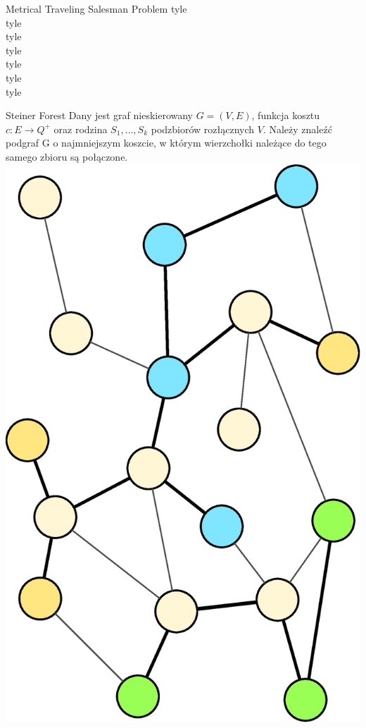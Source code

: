 \documentclass[final,hyperref={pdfpagelabels=false}]{beamer}
\begin{document}
\begin{frame}
\begin{columns}
\begin{column}{.96\textwidth}
			\begin{block}{Metrical Traveling Salesman Problem}
				tyle\\
				tyle\\
				tyle\\
				tyle\\
				tyle\\
				tyle\\
				tyle\\
			\end{block}
			\begin{block}{Steiner Forest}
				Dany jest graf nieskierowany $G = (V, E)$, funkcja kosztu $c: E \rightarrow Q^+$ oraz rodzina $S_1, \hdots, S_k$ podzbiorów rozłącznych $V$. Należy znaleźć podgraf G o najmniejszym koszcie, w którym wierzchołki należące do tego samego zbioru są połączone.
        \includegraphics[scale=0.5]{sf_poster.eps}

\end{block}
\end{column}
\end{columns}
\end{frame}
\end{document}
